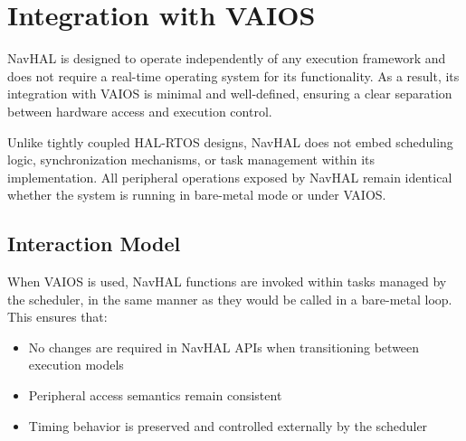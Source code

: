 \section{Integration with VAIOS}
\label{sec:navhal_vaios_integration}

NavHAL is designed to operate independently of any execution framework and does not require a real-time operating system for its functionality. As a result, its integration with VAIOS is minimal and well-defined, ensuring a clear separation between hardware access and execution control.

Unlike tightly coupled HAL-RTOS designs, NavHAL does not embed scheduling logic, synchronization mechanisms, or task management within its implementation. All peripheral operations exposed by NavHAL remain identical whether the system is running in bare-metal mode or under VAIOS.

\subsection*{Interaction Model}

When VAIOS is used, NavHAL functions are invoked within tasks managed by the scheduler, in the same manner as they would be called in a bare-metal loop. This ensures that:

\begin{itemize}
    \item No changes are required in NavHAL APIs when transitioning between execution models
    \item Peripheral access semantics remain consistent
    \item Timing behavior is preserved and controlled externally by the scheduler
\end{itemize}

